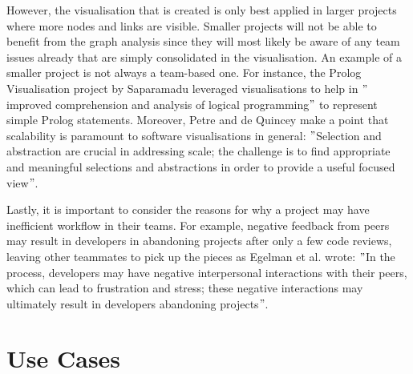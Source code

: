 \documentclass[sigconf]{acmart}
\begin{document}
However,
the visualisation that is created is only best applied in larger projects where more nodes and links are visible.
Smaller projects will not be able
to benefit from the graph analysis
since they will most likely be aware of any team issues already that are simply consolidated in the visualisation.
An example of a smaller project is not always a team-based one.
For instance, the Prolog Visualisation project by Saparamadu leveraged visualisations to help in \("\)improved comprehension and analysis of logical programming\("\)\cite{saparamadu2023prolog} to represent simple Prolog statements.
Moreover, Petre and de Quincey make a point that scalability is paramount to software visualisations in general: \("\)Selection and abstraction are crucial in
addressing scale; the challenge is to find appropriate and meaningful selections and abstractions in
order to provide a useful focused view\("\)\cite{eades1996software}.


Lastly, it is important to consider the reasons for why a project may have inefficient workflow in their teams.
For example, negative feedback from peers may result in developers in abandoning projects after only a few code reviews, leaving other teammates to pick up the pieces as Egelman et al.
wrote: \("\)In the process, developers may have negative
interpersonal interactions with their peers, which can lead to frustration and stress; these negative interactions may ultimately result
in developers abandoning projects\("\)\cite{EgelmanEtAl}.


\section{Use Cases}
\label{sec:use-cases}
\end{document}
